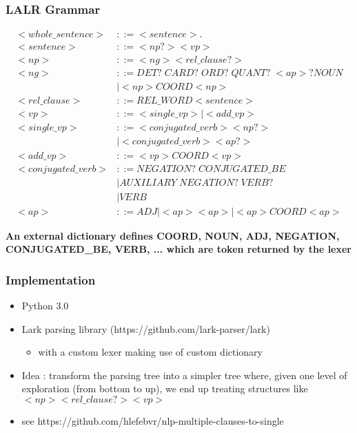 \documentclass{beamer}
\begin{document}
\begin{frame}
    \frametitle{LALR Grammar}

    {\tiny
    \begin{align*}
        <whole\_sentence> &::= <sentence> .\\
        <sentence> &::= <np?> <vp>\\
        <np> &::= <ng> <rel\_clause?>\\
        <ng> &::= DET?\; CARD?\; ORD?\; QUANT?\; <ap>? NOUN\\
            & | <np> COORD <np>\\
        <rel\_clause> &::= REL\_WORD <sentence>\\
        <vp> &::= <single\_vp> | <add\_vp>\\
        <single\_vp> &::= <conjugated\_verb> <np?>\\
            & | <conjugated\_verb> <ap?>\\
        <add\_vp> &::= <vp> COORD <vp>\\
        <conjugated\_verb> &::= NEGATION?\; CONJUGATED\_BE\\
            & | AUXILIARY\; NEGATION?\; VERB?\\
            & | VERB\\
        <ap> &::= ADJ | <ap> <ap> | <ap> COORD <ap>
    \end{align*}
    }

    \textbf{An external dictionary defines COORD, NOUN, ADJ, NEGATION, CONJUGATED\_BE, VERB, ... which are token returned by the lexer}
\end{frame}

\begin{frame}
    \frametitle{Implementation}
    \begin{itemize}
        \item Python 3.0
        \item Lark parsing library (https://github.com/lark-parser/lark)
        \begin{itemize}
            \item with a custom lexer making use of custom dictionary
        \end{itemize}
        \item Idea : transform the parsing tree into a simpler tree where, given one level of exploration (from bottom to up), we end up treating structures like $<np><rel\_clause?><vp>$
        \item see https://github.com/hlefebvr/nlp-multiple-clauses-to-single
    \end{itemize}
\end{frame}
\end{document}
